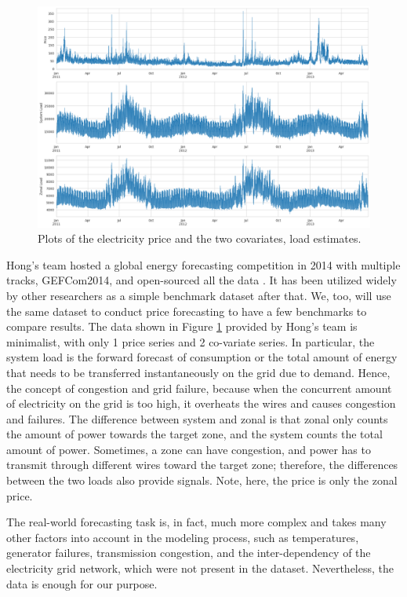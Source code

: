 \documentclass[11pt, letterpaper, journal]{IEEEtran}
\begin{document}
\begin{figure}[!h]
\centering
\captionsetup{justification=centering}
\includegraphics[width=1.0\textwidth]{1.a.png}
\caption{Plots of the electricity price and the two covariates, load estimates.}
\label{fig:competition_data}
\end{figure}

Hong's team hosted a global energy forecasting competition in 2014 with multiple tracks, GEFCom2014, and open-sourced all the data \cite{HONG2016896}. It has been utilized widely by other researchers as a simple benchmark dataset after that. We, too, will use the same dataset to conduct price forecasting to have a few benchmarks to compare results. The data shown in Figure \ref{fig:competition_data} provided by Hong's team is minimalist, with only 1 price series and 2 co-variate series. In particular, the system load is the forward forecast of consumption or the total amount of energy that needs to be transferred instantaneously on the grid due to demand. Hence, the concept of congestion and grid failure, because when the concurrent amount of electricity on the grid is too high, it overheats the wires and causes congestion and failures. The difference between system and zonal is that zonal only counts the amount of power towards the target zone, and the system counts the total amount of power. Sometimes, a zone can have congestion, and power has to transmit through different wires toward the target zone; therefore, the differences between the two loads also provide signals. Note, here, the price is only the zonal price.

The real-world forecasting task is, in fact, much more complex and takes many other factors into account in the modeling process, such as temperatures, generator failures, transmission congestion, and the inter-dependency of the electricity grid network, which were not present in the dataset. Nevertheless, the data is enough for our purpose.
\end{document}
